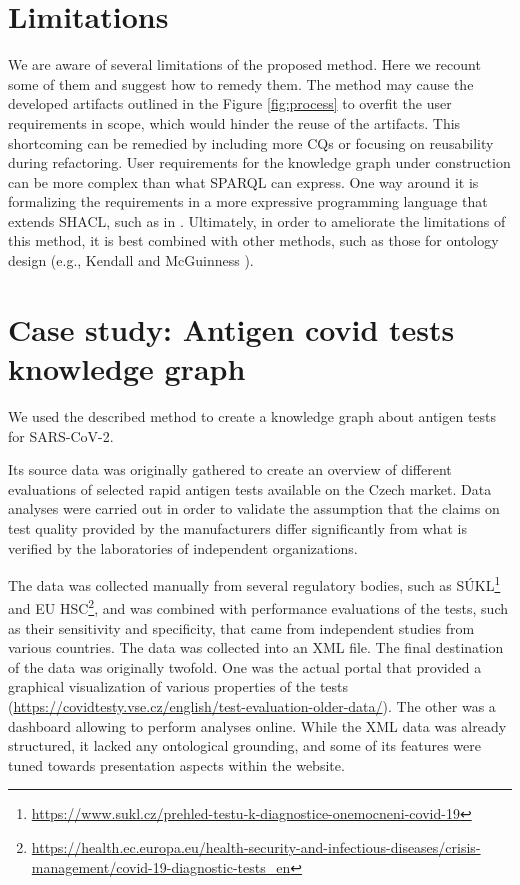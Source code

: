 \documentclass[
]{ceurart}
\begin{document}
\section{Limitations}
We are aware of several limitations of the proposed method. Here we recount some of them and suggest how to remedy them. The method may cause the developed artifacts outlined in the Figure \ref{fig:process} to overfit the user requirements in scope, which would hinder the reuse of the artifacts. This shortcoming can be remedied by including more CQs or focusing on reusability during refactoring. User requirements for the knowledge graph under construction can be more complex than what SPARQL can express. One way around it is formalizing the requirements in a more expressive programming language that extends SHACL, such as in \cite{SHACLJS2017}. Ultimately, in order to ameliorate the limitations of this method, it is best combined with other methods, such as those for ontology design (e.g., Kendall and McGuinness \cite{Kendall2019}).

\section{Case study: Antigen covid tests knowledge graph}

We used the described method to create a knowledge graph about antigen tests for SARS-CoV-2. 

Its source data was originally gathered to create an overview of different evaluations of selected rapid antigen tests available on the Czech market. 
Data analyses were carried out  \cite{Kliegr2022} in order to validate the assumption that the claims on test quality provided by the manufacturers differ significantly from what is verified by the laboratories of independent organizations.

The data was collected manually from several regulatory bodies, such as SÚKL\footnote{\url{https://www.sukl.cz/prehled-testu-k-diagnostice-onemocneni-covid-19}} and EU HSC\footnote{\url{https://health.ec.europa.eu/health-security-and-infectious-diseases/crisis-management/covid-19-diagnostic-tests_en}}, and was combined with performance evaluations of the tests, such as their sensitivity and specificity, that came from independent studies from various countries. 
The data was collected into an XML file. 
The final destination of the data was originally twofold.
One was the actual portal that provided a graphical visualization of various properties of the tests (\url{https://covidtesty.vse.cz/english/test-evaluation-older-data/}).
The other was a dashboard allowing to perform analyses online.
While the XML data was already structured, it lacked any ontological grounding, and some of its features were tuned towards presentation aspects within the website.
\end{document}
